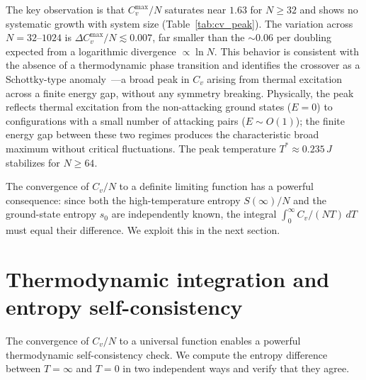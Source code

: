 \documentclass[aps, pre, reprint, amsmath, amssymb, superscriptaddress, floatfix]{revtex4-2}
\begin{document}
The key observation is that $C_v^{\max}/N$ saturates near $1.63$ for
$N \ge 32$ and shows no systematic growth with system size
(Table~\ref{tab:cv_peak}).  The variation across
$N = 32$--$1024$ is $\Delta C_v^{\max}/N \lesssim 0.007$, far smaller
than the $\sim 0.06$ per doubling expected from a logarithmic
divergence $\propto \ln N$.
This behavior is consistent with the absence of a thermodynamic phase
transition and identifies the crossover as a
Schottky-type anomaly~\cite{Binder2010}---a broad peak in $C_v$
arising from thermal excitation across a finite energy gap, without
any symmetry breaking.  Physically, the peak reflects thermal
excitation from the non-attacking ground states ($E = 0$) to
configurations with a small number of attacking pairs
($E \sim O(1)$); the finite energy gap between these two regimes
produces the characteristic broad maximum without critical
fluctuations.  The peak temperature $T^* \approx 0.235\,J$
stabilizes for $N \ge 64$.

The convergence of $C_v/N$ to a definite limiting function has a
powerful consequence: since both the high-temperature entropy
$S(\infty)/N$ and the ground-state entropy $s_0$ are independently
known, the integral $\int_0^\infty C_v/(NT)\,dT$ must equal their
difference.  We exploit this in the next section.


\section{Thermodynamic integration and entropy self-consistency}
\label{sec:thermo_int}

The convergence of $C_v/N$ to a universal function enables a powerful
thermodynamic self-consistency check.  We compute the entropy
difference between $T = \infty$ and $T = 0$ in two independent ways
and verify that they agree.
\end{document}
